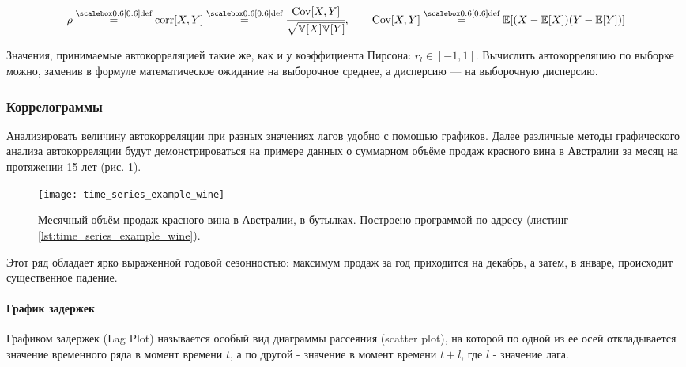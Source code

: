 \begin{equation*}
    \rho \defeq \text{corr}[X, Y] \defeq 
    \cfrac{\text{Cov}[X, Y]}{\sqrt{\mathbb{V}[X]\mathbb{V}[Y]}}, \qquad 
    \text{Cov}[X, Y] \defeq \mathbb{E}[(X - \mathbb{E}[X])(Y - \mathbb{E}[Y])]
\end{equation*}

Значения, принимаемые автокорреляцией такие же, как и у коэффициента 
Пирсона: $r_l \in [-1, 1]$. Вычислить автокорреляцию по выборке можно, заменив в формуле 
математическое ожидание на выборочное среднее, а дисперсию — на выборочную дисперсию.

\subsubsection{Коррелограммы}
Анализировать величину автокорреляции при разных значениях лагов удобно с помощью графиков. 
Далее различные методы графического анализа автокорреляции будут демонстрироваться 
на примере данных о суммарном объёме продаж красного вина в Австралии за
месяц на протяжении 15 лет (рис. \ref{fig:time_series_wine}).

\begin{figure}[h!]
    \centering
    \texttt{[image: time\_series\_example\_wine]}
    \caption{Месячный объём продаж красного вина в Австралии, в бутылках. 
    Построено программой по адресу (листинг \ref{lst:time_series_example_wine}).}
    \label{fig:time_series_wine}
\end{figure}

Этот ряд обладает ярко выраженной годовой сезонностью: максимум продаж за год 
приходится на декабрь, а затем, в январе, происходит существенное падение.

\paragraph{График задержек}
Графиком задержек (Lag Plot) называется особый вид диаграммы рассеяния (scatter plot), 
на которой по одной из ее осей откладывается значение временного ряда в момент времени 
$t$, а по другой - значение в момент времени $t + l$, где $l$ - значение лага.

